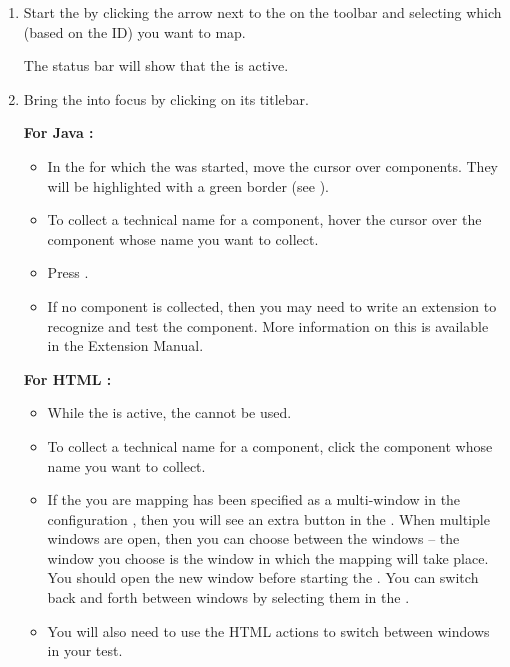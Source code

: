 \begin{enumerate}
\item Start the \gdomm{} by clicking the arrow next to the on the toolbar and selecting which \gdaut{} (based on the \gdaut{} ID) you want to map. 


The status bar will show that the \gdomm{} is active. 
\item Bring the \gdaut{} into focus by clicking on its titlebar. 

\textbf{For Java \gdauts{}:}
\begin{itemize}
\item In the \gdaut{} for which the \gdomm{} was started, move the cursor over components. They will be highlighted with a green border (see ). 
\item To collect a technical name for a component, hover the cursor over the component whose name you want to collect. 
\item Press .
\item If no component is collected, then you may need to write an extension to recognize and test the component. More information on this is available in the Extension Manual.
\end{itemize}

\textbf{For HTML \gdauts{}:}
\begin{itemize}
\item While the \gdomm{} is active, the \gdaut{} cannot be used. 
\item To collect a technical name for a component, click the component whose name you want to collect. 
\item If the \gdaut{} you are mapping has been specified as a multi-window \gdaut{} in the \gdaut{} configuration , then you will see an extra button in the \gdomeditor{}. When multiple windows are open, then you can choose between the windows -- the window you choose is the window in which the mapping will take place. You should open the new window before starting the \gdomm{}. You can switch back and forth between windows by selecting them in the \gdomeditor{}. 
\item You will also need to use the HTML actions to switch between windows in your test. 
\end{itemize}


\end{enumerate}
